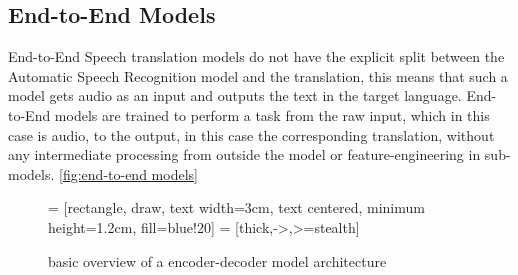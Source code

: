 \subsection{End-to-End Models}
End-to-End Speech translation models do not have the explicit split between the Automatic Speech Recognition model and the translation, this means that such a model gets audio as an input and outputs the text in the target language. 
End-to-End models are trained to perform a task from the raw input, which in this case is audio, to the output, in this case the corresponding translation, without any intermediate processing from outside the model or feature-engineering in sub-models. \autoref{fig:end-to-end models}
\begin{figure}
    \centering%
     = [rectangle, draw, text width=3cm, text centered, minimum height=1.2cm, fill=blue!20]
 = [thick,->,>=stealth]

\caption{basic overview of a encoder-decoder model architecture}
\label{fig:end-to-end models}
\end{figure}


